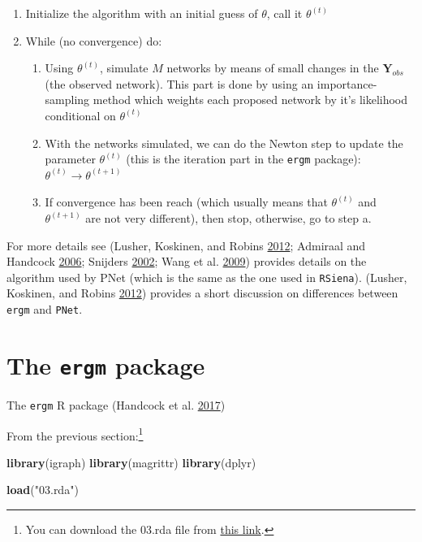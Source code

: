 \documentclass[]{book}
\newenvironment{Shaded}{\begin{snugshade}}{\end{snugshade}}
\newcommand{\KeywordTok}[1]{\textcolor[rgb]{0.13,0.29,0.53}{\textbf{#1}}}
\newcommand{\StringTok}[1]{\textcolor[rgb]{0.31,0.60,0.02}{#1}}
\newcommand{\NormalTok}[1]{#1}
\let\rmarkdownfootnote\footnote%
\def\footnote{\protect\rmarkdownfootnote}
\theoremstyle{definition}
\theoremstyle{definition}
\theoremstyle{definition}
\theoremstyle{remark}
\begin{document}
\begin{enumerate}
\def\labelenumi{\arabic{enumi}.}
\item
  Initialize the algorithm with an initial guess of \(\theta\), call it
  \(\theta^{(t)}\)
\item
  While (no convergence) do:

  \begin{enumerate}
  \def\labelenumii{\alph{enumii}.}
  \item
    Using \(\theta^{(t)}\), simulate \(M\) networks by means of small
    changes in the \(\mathbf{Y}_{obs}\) (the observed network). This
    part is done by using an importance-sampling method which weights
    each proposed network by it's likelihood conditional on
    \(\theta^{(t)}\)
  \item
    With the networks simulated, we can do the Newton step to update the
    parameter \(\theta^{(t)}\) (this is the iteration part in the
    \texttt{ergm} package): \(\theta^{(t)}\to\theta^{(t+1)}\)
  \item
    If convergence has been reach (which usually means that
    \(\theta^{(t)}\) and \(\theta^{(t + 1)}\) are not very different),
    then stop, otherwise, go to step a.
  \end{enumerate}
\end{enumerate}

For more details see (Lusher, Koskinen, and Robins
\protect\hyperlink{ref-lusher2012}{2012}; Admiraal and Handcock
\protect\hyperlink{ref-admiraal2006}{2006}; Snijders
\protect\hyperlink{ref-Snijders2002}{2002}; Wang et al.
\protect\hyperlink{ref-Wang2009}{2009}) provides details on the
algorithm used by PNet (which is the same as the one used in
\texttt{RSiena}). (Lusher, Koskinen, and Robins
\protect\hyperlink{ref-lusher2012}{2012}) provides a short discussion on
differences between \texttt{ergm} and \texttt{PNet}.

\section{\texorpdfstring{The \texttt{ergm}
package}{The ergm package}}\label{the-ergm-package}

The \texttt{ergm} R package (Handcock et al.
\protect\hyperlink{ref-R-ergm}{2017})

From the previous section:\footnote{You can download the 03.rda file
  from \href{https://github.com/gvegayon/appliedsnar}{this link}.}

\begin{Shaded}
\begin{Highlighting}[]
\KeywordTok{library}\NormalTok{(igraph)}
\KeywordTok{library}\NormalTok{(magrittr)}
\KeywordTok{library}\NormalTok{(dplyr)}

\KeywordTok{load}\NormalTok{(}\StringTok{"03.rda"}\NormalTok{)}
\end{Highlighting}
\end{Shaded}
\end{document}
